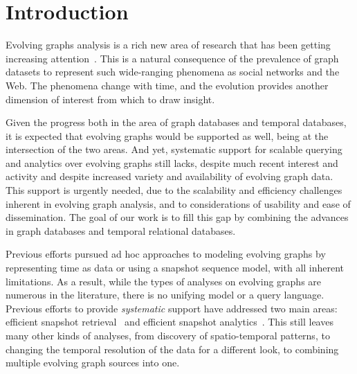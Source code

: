 \section{Introduction}
\label{sec:intro}

Evolving graphs analysis is a rich new area of research that has been
getting increasing
attention~\cite{DBLP:journals/csur/AggarwalS14,Miao2015,Ren2011,Semertzidis2015}.
This is a natural consequence of the prevalence of graph datasets to
represent such wide-ranging phenomena as social networks and the Web.
The phenomena change with time, and the evolution provides another
dimension of interest from which to draw insight.

Given the progress both in the area of graph databases and temporal
databases, it is expected that evolving graphs would be supported as
well, being at the intersection of the two areas.  And yet, systematic
support for scalable querying and analytics over evolving graphs still
lacks, despite much recent interest and activity and despite increased
variety and availability of evolving graph data.  This support is
urgently needed, due to the scalability and efficiency challenges
inherent in evolving graph analysis, and to considerations of
usability and ease of dissemination.  The goal of our work is to fill
this gap by combining the advances in graph databases and temporal
relational databases.

Previous efforts pursued ad hoc approaches to modeling evolving graphs
by representing time as data or using a snapshot sequence model, with
all inherent limitations.  As a result, while the types of analyses on
evolving graphs are numerous in the literature, there is no unifying
model or a query language.  Previous efforts to provide {\em
  systematic} support have addressed two main areas: efficient
snapshot retrieval~\cite{Khurana2013,Khurana2016} and efficient
snapshot analytics~\cite{Miao2015,MoffittTempWeb16}.  This still
leaves many other kinds of analyses, from discovery of spatio-temporal
patterns, to changing the temporal resolution of the data for a
different look, to combining multiple evolving graph sources into one.


